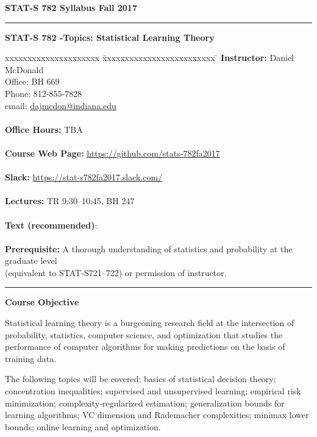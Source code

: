 \documentclass[10pt]{article}
\newcommand{\email}[1]{\href{mailto:#1}{#1}}
\begin{document}
\noindent\textbf{\sc STAT-S 782
        \hfill Syllabus
        \hfill Fall 2017}
\rule{6.5in}{1pt}

\begin{center}
{\bf {\Large STAT-S 782 -Topics: Statistical Learning Theory}}
\end{center}

\begin{tabbing}
xxxxxxxxxxxxxxxxxxxxx \= xxxxxxxxxxxxxxxxxxxxxxxxx \= \kill
{\bf Instructor:}  \> Daniel McDonald\\
\> Office: BH 669\\
\>Phone: 812-855-7828\\
\> email: \email{dajmcdon@indiana.edu}\\
 \\
{\bf Office Hours:}  
\> TBA \\
\\
{\bf Course Web Page:}  \> \url{https://github.com/stats-782fa2017}\\
\\
{\bf Slack:} \> \url{https://stat-s782fa2017.slack.com/}\\
\\
{\bf Lectures:} \>  TR 9:30--10:45, BH 247\\
\\
{\bf Text (recommended)}:\> \citet{Tsybakov2009,BoucheronLugosi2013,BoydVandenberghe2004}\\
\\
{\bf Prerequisite:} \>  A thorough understanding of statistics and
probability at the graduate level\\
\> (equivalent to STAT-S721--722) or permission of instructor.
                     
\end{tabbing}
\rule{6.5in}{1pt}

{\bf Course Objective}

Statistical learning theory is a burgeoning research field at the
intersection of probability, statistics, computer science, and
optimization that studies the performance of computer algorithms for
making predictions on the basis of training data. 

The following topics will be covered: basics of statistical decision
theory; concentration inequalities; supervised and unsupervised
learning; empirical risk minimization; complexity-regularized
estimation; generalization bounds for learning algorithms; VC
dimension and Rademacher complexities; minimax lower bounds; online
learning and optimization. 
\end{document}
